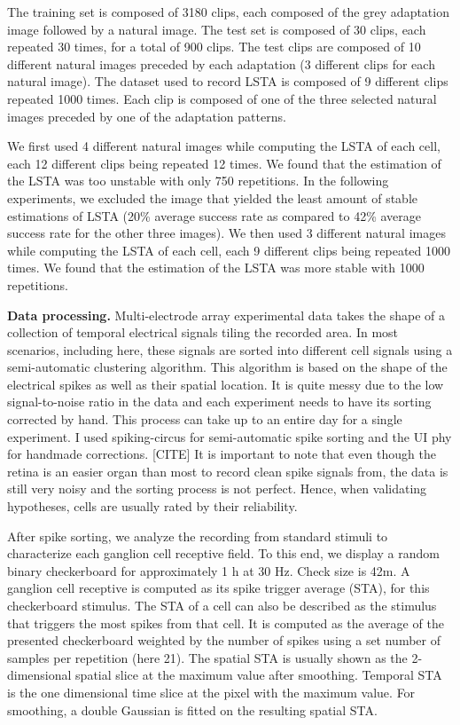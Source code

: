 The training set is composed of 3180 clips, each composed of the grey
adaptation image followed by a natural image. The test set is composed of 30
clips, each repeated 30 times, for a total of 900 clips.
The test clips are composed of 10 different natural
images preceded by each adaptation (3 different clips for each natural image).
The dataset used to record LSTA is composed of 9 different clips repeated 1000
times. Each clip is composed of one of the three selected natural images
preceded by one of the adaptation patterns.

We first used 4 different natural images while computing the LSTA of each cell,
each 12 different clips being repeated 12 times. We found that the estimation
of the LSTA was too unstable with only 750 repetitions. In the following
experiments, we excluded the image that yielded the least amount of stable
estimations of LSTA (20\% average success rate as compared to 42\% average
success rate for the other three images). We then used 3 different natural
images while computing the LSTA of each cell, each 9 different clips being
repeated 1000 times. We found that the estimation of the LSTA was more stable
with 1000 repetitions.

\textbf{Data processing.}
Multi-electrode array experimental data takes the shape of a collection of
temporal electrical signals tiling the recorded area.
In most scenarios, including here, these signals are sorted into different cell
signals using a semi-automatic clustering algorithm. This algorithm is based on
the shape
of the electrical spikes as well as their spatial location. It is
quite messy due to the low signal-to-noise ratio in the data and each
experiment needs to have its sorting corrected by hand.
This process can take up to an
entire day for a single experiment. I used spiking-circus for semi-automatic
spike sorting and the UI phy for handmade corrections. [CITE]
It is important to note that even though the retina is an easier organ than
most to record clean spike signals from, the data is still very noisy and the
sorting process is not perfect. Hence, when validating hypotheses, cells are
usually rated by their reliability.

After spike sorting, we analyze the recording from standard stimuli to
characterize each
ganglion cell receptive field. To this end, we display a random binary
checkerboard for approximately 1 h at 30 Hz. Check size is 42\textmu m. A
ganglion cell receptive is computed as its spike trigger average (STA), for
this checkerboard stimulus. The STA of a cell can also be described as the
stimulus that triggers the most spikes from that cell. It is computed as the
average of the presented checkerboard weighted by the number of spikes using a
set number of samples per repetition (here 21). The spatial STA is usually
shown as the 2-dimensional spatial slice at the maximum value after smoothing.
Temporal STA is the one dimensional time slice at the pixel with the maximum
value. For smoothing, a double Gaussian is fitted on the resulting spatial
STA.

